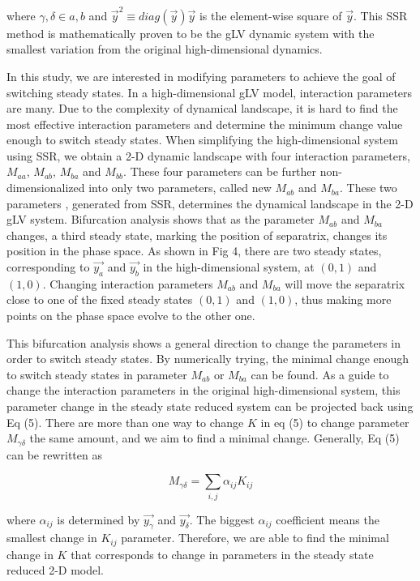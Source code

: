\documentclass[10pt,letterpaper]{article}
\begin{document}
where $\gamma,\delta \in a,b$ and $\vec{y}^2 \equiv diag(\vec{y})\vec{y}$ is the element-wise square of $\vec{y}$. This SSR method is mathematically proven to be the gLV dynamic system with the smallest variation from the original high-dimensional dynamics. 


In this study, we are interested in modifying parameters to achieve the goal of switching steady states. In a high-dimensional gLV model, interaction parameters are many. Due to the complexity of dynamical landscape, it is hard to find the most effective interaction parameters and determine the minimum change value enough to switch steady states. When simplifying the high-dimensional system using SSR, we obtain a 2-D dynamic landscape with four interaction parameters, $M_{aa}$, $M_{ab}$, $M_{ba}$ and $M_{bb}$. These four parameters can be further non-dimensionalized into  only two parameters, called new $M_{ab}$ and $M_{ba}$. These two parameters  , generated from SSR, determines the dynamical landscape in the 2-D gLV system. Bifurcation analysis shows that as the parameter $M_{ab}$ and $M_{ba}$ changes, a third steady state, marking the position of separatrix, changes its position in the phase space. As shown in Fig 4, there are two steady states, corresponding to $\vec{y_a}$ and $\vec{y_b}$ in the high-dimensional system, at $(0,1)$ and $(1,0)$. Changing interaction parameters $M_{ab}$ and $M_{ba}$ will move the separatrix close to one of the fixed steady states $(0,1)$ and $(1,0)$, thus making more points on the phase space evolve to the other one. 

This bifurcation analysis shows a general direction to change the parameters in order to switch steady states. By numerically trying, the minimal change enough to switch steady states in parameter $M_{ab}$ or $M_{ba}$ can be found. As a guide to change the interaction parameters in the original high-dimensional system, this parameter change in the steady state reduced system can be projected back using Eq (5). There are more than one way to change $K$ in eq (5) to change parameter $M_{\gamma\delta}$ the same amount, and we aim to find a minimal change. Generally, Eq (5) can be rewritten as 

\begin{equation}
M_{\gamma\delta} = \sum_{i,j}\alpha_{ij}K_{ij}
\end{equation}

where $\alpha_{ij}$ is determined by $\vec{y_\gamma}$ and $\vec{y_\delta}$.  The biggest $\alpha_{ij}$ coefficient means the smallest change in $K_{ij}$  parameter. Therefore, we are able to find the minimal change in $K$ that corresponds to change in parameters in the steady state reduced 2-D model. 
\end{document}
